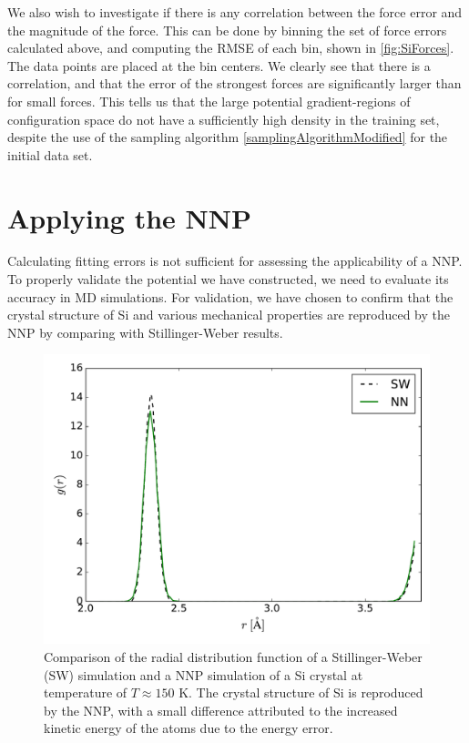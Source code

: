 \documentclass[twoside,english]{uiofysmaster}
\begin{document}
We also wish to investigate if there is any correlation between the force error and the magnitude of the force. 
This can be done by binning the set of force errors calculated above, and computing the RMSE of each bin, shown 
in \autoref{fig:SiForces}. The data points are placed at the bin centers. We clearly see that there 
is a correlation, and that the error of the strongest forces are significantly larger than for small forces. 
This tells us that the large potential gradient-regions of configuration space do not have a sufficiently
high density in the training set, despite the use of the sampling algorithm \eqref{samplingAlgorithmModified}
for the initial data set. 



\section{Applying the NNP}
Calculating fitting errors is not sufficient for assessing the applicability of a NNP. 
To properly validate the potential we have constructed, we need to evaluate its accuracy in MD simulations.
For validation, we have chosen to confirm that the crystal structure of Si and various mechanical properties are reproduced by the NNP
by comparing with Stillinger-Weber results. 
\begin{figure}
\centering
  \includegraphics[width = 0.8\linewidth]{Figures/Results/radialDist.pdf}
  \caption{Comparison of the radial distribution function of a Stillinger-Weber (SW) simulation and 
           a NNP simulation of a Si crystal at temperature of $T \approx 150$ K. The crystal structure 
           of Si is reproduced by the NNP, with a small difference attributed to the increased kinetic 
           energy of the atoms due to the energy error. }
  \label{fig:radialDist}
\end{figure}
\end{document}
